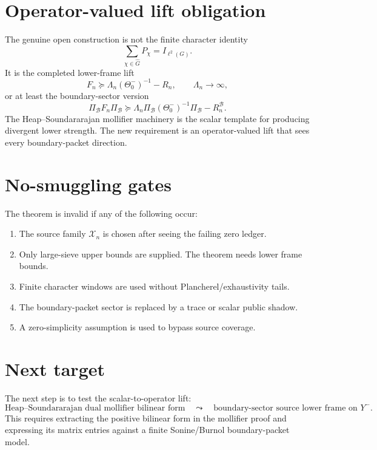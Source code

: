 \documentclass[11pt]{article}
\begin{document}
\section{Operator-valued lift obligation}
The genuine open construction is not the finite character identity
\[
  \sum_{\chi\in\widehat G}P_\chi=I_{\ell^2(G)}.
\]
It is the completed lower-frame lift
\[
  F_n\succeq \Lambda_n(\Theta_0^-)^{-1}-R_n,
  \qquad \Lambda_n\to\infty,
\]
or at least the boundary-sector version
\[
  \Pi_{\mathcal B}F_n\Pi_{\mathcal B}
  \succeq
  \Lambda_n\Pi_{\mathcal B}(\Theta_0^-)^{-1}\Pi_{\mathcal B}-R_n^{\mathcal B}.
\]
The Heap--Soundararajan mollifier machinery is the scalar template for producing divergent lower strength.  The new requirement is an operator-valued lift that sees every boundary-packet direction.

\section{No-smuggling gates}
The theorem is invalid if any of the following occur:
\begin{enumerate}[leftmargin=2em]
\item The source family $\mathcal X_n$ is chosen after seeing the failing zero ledger.
\item Only large-sieve upper bounds are supplied.  The theorem needs lower frame bounds.
\item Finite character windows are used without Plancherel/exhaustivity tails.
\item The boundary-packet sector is replaced by a trace or scalar public shadow.
\item A zero-simplicity assumption is used to bypass source coverage.
\end{enumerate}

\section{Next target}
The next step is to test the scalar-to-operator lift:
\[
\text{Heap--Soundararajan dual mollifier bilinear form}
\quad\leadsto\quad
\text{boundary-sector source lower frame on }Y^-.
\]
This requires extracting the positive bilinear form in the mollifier proof and expressing its matrix entries against a finite Sonine/Burnol boundary-packet model.
\end{document}
